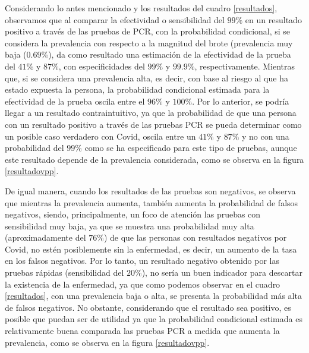 \documentclass{article}
\begin{document}
Considerando lo antes mencionado y los resultados del cuadro \ref{resultados}, observamos que al comparar la efectividad o sensibilidad del $99\%$ en un resultado positivo a través de las pruebas de PCR, con la probabilidad condicional, si se considera la prevalencia con respecto a la magnitud del brote (prevalencia muy baja ($0.69\%$), da como resultado una estimación de la efectividad de la prueba del $41\%$ y $87\%$, con especificidades del $99\%$ y $99.9\%$, respectivamente. Mientras que, si se considera una prevalencia alta, es decir, con base al riesgo al que ha estado expuesta la persona, la probabilidad condicional estimada para la efectividad de la prueba oscila entre el $96\%$ y $100\%$. Por lo anterior, se podría llegar a un resultado contraintuitivo, ya que la probabilidad de que una persona con un resultado positivo a través de las pruebas PCR se pueda determinar como un posible caso verdadero con Covid, oscila entre un $41\%$ y $87\%$ y no con una probabilidad del $99\%$ como se ha especificado para este tipo de pruebas, aunque este resultado depende de la prevalencia considerada, como se observa en la figura \ref{resultadovpp}.

De igual manera, cuando los resultados de las pruebas son negativos, se observa que mientras la prevalencia aumenta, también aumenta la probabilidad de falsos negativos, siendo, principalmente, un foco de atención las pruebas con sensibilidad muy baja, ya que se muestra una probabilidad muy alta (aproximadamente del $76\%$) de que las personas con resultados negativos por Covid, no estén posiblemente sin la enfermedad, es decir, un aumento de la tasa en los falsos negativos. Por lo tanto, un resultado negativo obtenido por las pruebas rápidas (sensibilidad del $20\%$), no sería un buen indicador para descartar la existencia de la enfermedad, ya que como podemos observar en el cuadro \ref{resultados}, con una prevalencia baja o alta, se presenta la probabilidad más alta de falsos negativos. No obstante, considerando que el resultado sea positivo, es posible que puedan ser de utilidad ya que la probabilidad condicional estimada es relativamente buena comparada las pruebas PCR a medida que aumenta la prevalencia, como se observa en la figura \ref{resultadovpp}.
\end{document}
